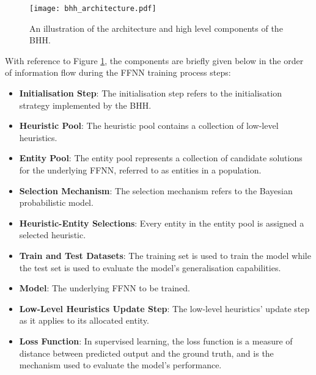 \begin{figure}[htbp]
      \centering
      \texttt{[image: bhh\_architecture.pdf]}
      \caption[An illustration of
            the architecture and high level components of the \acf{BHH}.]{An illustration of
            the architecture and high level components of the \acf{BHH}.}
      \label{fig:bhh_architecture}
\end{figure}

With reference to Figure \ref{fig:bhh_architecture}, the components are briefly given below in the order of information flow during the \acs{FFNN} training process steps:

\begin{itemize}
      \item \textbf{Initialisation Step}: The initialisation step refers to the initialisation strategy implemented by the \acs{BHH}.

      \item \textbf{Heuristic Pool}: The heuristic pool contains a collection of low-level heuristics.

      \item \textbf{Entity Pool}: The entity pool represents a collection of candidate solutions for the underlying \acs{FFNN}, referred to as entities in a population.

      \item \textbf{Selection Mechanism}: The selection mechanism refers to the Bayesian probabilistic model.

      \item \textbf{Heuristic-Entity Selections}: Every entity in the entity pool is assigned a selected heuristic.

      \item \textbf{Train and Test Datasets}: The training set is used to train the model while the test set is used to evaluate the model's generalisation capabilities.

      \item \textbf{Model}: The underlying \acs{FFNN} to be trained.

      \item \textbf{Low-Level Heuristics Update Step}: The low-level heuristics' update step as it applies to its allocated entity.

      \item \textbf{Loss Function}: In supervised learning, the loss function is a measure of distance between predicted output and the ground truth, and is the mechanism used to evaluate the model's performance.


\end{itemize}
